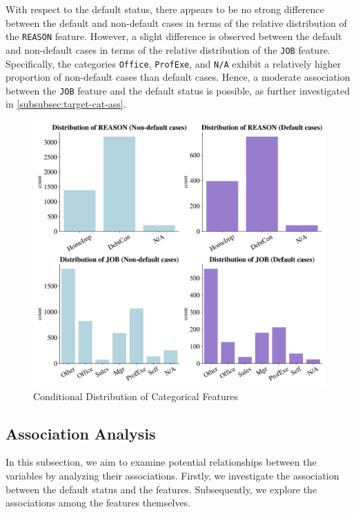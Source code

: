 With respect to the default status, there appears to be no strong difference between the default and non-default cases in terms of the relative distribution of the \texttt{REASON} feature.
However, a slight difference is observed between the default and non-default cases in terms of the relative distribution of the \texttt{JOB} feature.
Specifically, the categories \texttt{Office}, \texttt{ProfExe}, and \texttt{N/A} exhibit a relatively higher proportion of non-default cases than default cases.
Hence, a moderate association between the \texttt{JOB} feature and the default status is possible, as further investigated in \autoref{subsubsec:target-cat-ass}.



\begin{figure}[H]
\centering
\caption{Conditional Distribution of Categorical Features}\vspace{0.5em}
\label{fig:catdist}
\includegraphics[width=140mm]{Figures/Categorical_Features_Distribution.jpg}

\vspace{-1em}
\end{figure}
\subsection{Association Analysis}
\label{subsec:assanal}
In this subsection, we aim to examine potential relationships between the variables by analyzing their associations. Firstly, we investigate the association between the default status and the features. Subsequently, we explore the associations among the features themselves.

